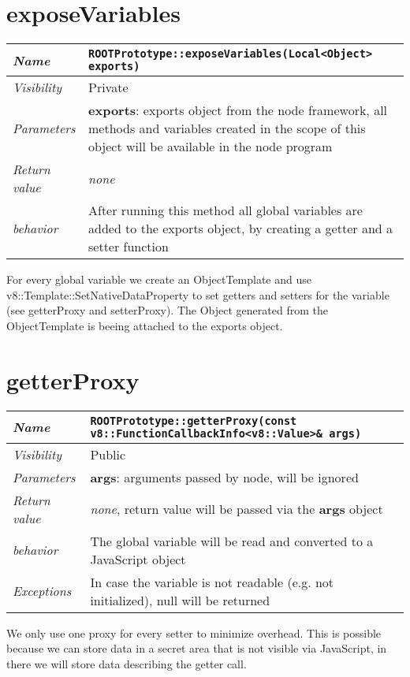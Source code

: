 \section{exposeVariables}
\begin{longtable}{p{3cm} @{\hskip 1cm} p{12cm}}
  \hline
  \textit{Name} & \texttt{ROOTPrototype::exposeVariables(Local<Object> exports)} \\
  \hline
  \textit{Visibility} & Private \\
  \hline
  \textit{Parameters} & \textbf{exports}: exports object from the node framework, all methods and variables created in the scope of this object will be available in the node program \\
  \hline
  \textit{Return value} & \textit{none} \\
  \hline
  \textit{behavior} & After running this method all global variables are added to the exports object, by creating a getter and a setter function \\
  \hline
\end{longtable}

For every global variable we create an ObjectTemplate and use v8::Template::SetNativeDataProperty to set getters and setters for the variable (see getterProxy and setterProxy).
The Object generated from the ObjectTemplate is beeing attached to the exports object.

\newpage
\section{getterProxy}
\begin{longtable}{p{3cm} @{\hskip 1cm} p{12cm}}
  \hline
  \textit{Name} & \texttt{ROOTPrototype::getterProxy(const v8::FunctionCallbackInfo<v8::Value>\& args)} \\
  \hline
  \textit{Visibility} & Public \\
  \hline
  \textit{Parameters} & \textbf{args}: arguments passed by node, will be ignored \\
  \hline
  \textit{Return value} & \textit{none}, return value will be passed via the \textbf{args} object \\
  \hline
  \textit{behavior} & The global variable will be read and converted to a JavaScript object\\
  \hline
  \textit{Exceptions} & In case the variable is not readable (e.g. not initialized), null will be returned \\
  \hline
\end{longtable}
We only use one proxy for every setter to minimize overhead. This is possible because we can store data in a secret area that is not visible via JavaScript, in there we will store data describing the getter call.
\newpage
